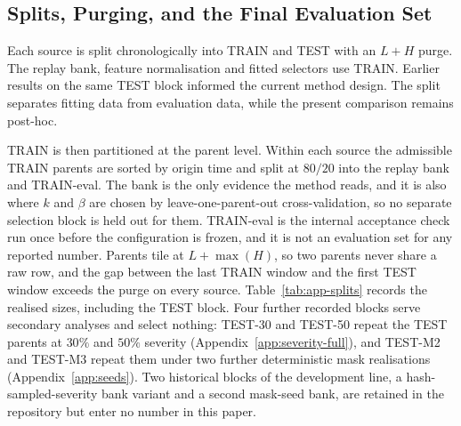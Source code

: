 \documentclass{article}
\begin{document}
\subsection{Splits, Purging, and the Final Evaluation Set}
\label{app:splits}
Each source is split chronologically into TRAIN and TEST with an $L+H$ purge.
The replay bank, feature normalisation and fitted selectors use TRAIN. Earlier results on
the same TEST block informed the current method design. The split separates fitting data
from evaluation data, while the present comparison remains post-hoc.

TRAIN is then partitioned at the parent level. Within each source the admissible TRAIN parents
are sorted by origin time and split at $80/20$ into the replay bank and TRAIN-eval. The bank is
the only evidence the method reads, and it is also where $k$ and $\beta$ are chosen by
leave-one-parent-out cross-validation, so no separate selection block is held out for them.
TRAIN-eval is the internal acceptance check run once before the configuration is frozen, and
it is not an evaluation set for any reported number. Parents tile at $L + \max(H)$, so two
parents never share a raw row, and the gap between the last TRAIN window and the first TEST
window exceeds the purge on every source.
Table~\ref{tab:app-splits} records the realised sizes, including the TEST block.
Four further recorded blocks serve secondary analyses and select nothing: TEST-30 and
TEST-50 repeat the TEST parents at $30\%$ and $50\%$ severity
(Appendix~\ref{app:severity-full}), and TEST-M2 and TEST-M3 repeat them under two further
deterministic mask realisations (Appendix~\ref{app:seeds}). Two historical blocks of the
development line, a hash-sampled-severity bank variant and a second mask-seed bank, are
retained in the repository but enter no number in this paper.

\begin{table}[htbp]
  \caption{Realised split sizes. Counts are of admissible parents and not of correlated mask
  variants, so a parent with several patterns or severities still contributes one unit to
  every statistic in the paper. TEST is the evaluation population for every table in the main
  text, and it is disjoint from both TRAIN blocks.}
  \label{tab:app-splits}
  \centering
  \small
  \setlength{\tabcolsep}{4pt}
\end{table}
\end{document}
